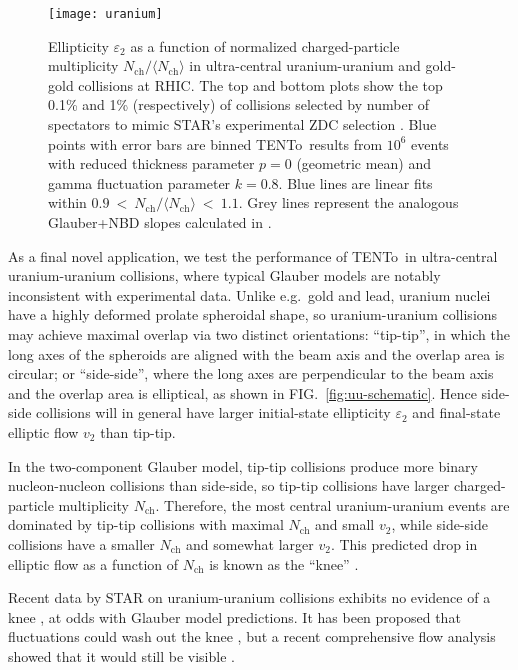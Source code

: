 \documentclass[aps,prc,reprint,amsmath,nofootinbib]{revtex4-1}
\newcommand{\trento}{T\raisebox{-.5ex}{R}ENTo}
\newcommand{\nch}{N_\text{ch}}
\begin{document}
\begin{figure}[b]
  \centering
  \texttt{[image: uranium]}
  \caption{
    \label{fig:uranium}
    Ellipticity $\varepsilon_2$ as a function of normalized charged-particle multiplicity
    $\nch/\langle\nch\rangle$ in ultra-central uranium-uranium and gold-gold collisions at RHIC.  The top and
    bottom plots show the top 0.1\% and 1\% (respectively) of collisions selected by number of spectators to
    mimic STAR's experimental ZDC selection \cite{FortheSTAR:2013bza}.  Blue points with error bars are binned
    \protect\trento\ results from $10^6$ events with reduced thickness parameter $p = 0$ (geometric mean) and
    gamma fluctuation parameter $k = 0.8$.  Blue lines are linear fits within
    $0.9~<~\nch/\langle\nch\rangle~<~1.1$.  Grey lines represent the analogous Glauber+NBD slopes calculated
    in \cite{FortheSTAR:2013bza}.
  }
\end{figure}

As a final novel application, we test the performance of \trento\ in ultra-central uranium-uranium collisions, where typical Glauber models are notably inconsistent with experimental data.
Unlike e.g.~gold and lead, uranium nuclei have a highly deformed prolate spheroidal shape, so uranium-uranium collisions may achieve maximal overlap via two distinct orientations:
``tip-tip'', in which the long axes of the spheroids are aligned with the beam axis and the overlap area is circular;
or ``side-side'', where the long axes are perpendicular to the beam axis and the overlap area is elliptical, as shown in FIG.~\ref{fig:uu-schematic}.
Hence side-side collisions will in general have larger initial-state ellipticity $\varepsilon_2$ and final-state elliptic flow $v_2$ than tip-tip.

In the two-component Glauber model, tip-tip collisions produce more binary nucleon-nucleon collisions than side-side, so tip-tip collisions have larger charged-particle multiplicity $\nch$.
Therefore, the most central uranium-uranium events are dominated by tip-tip collisions with maximal $\nch$ and small $v_2$, while side-side collisions have a smaller $\nch$ and somewhat larger $v_2$.
This predicted drop in elliptic flow as a function of $\nch$ is known as the ``knee'' \cite{Voloshin:2010ut}.

Recent data by STAR on uranium-uranium collisions exhibits no evidence of a knee \cite{FortheSTAR:2013bza,Wang:2014qxa}, at odds with Glauber model predictions.
It has been proposed that fluctuations could wash out the knee \cite{Rybczynski:2012av}, but a recent comprehensive flow analysis showed that it would still be visible \cite{osu}.
\end{document}
